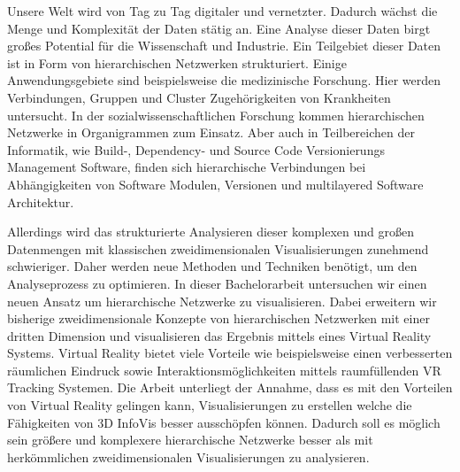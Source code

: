 Unsere Welt wird von Tag zu Tag digitaler und vernetzter. Dadurch wächst die Menge und Komplexität der Daten stätig an.
Eine Analyse dieser Daten birgt großes Potential für die Wissenschaft und Industrie.
Ein Teilgebiet dieser Daten ist in Form von hierarchischen Netzwerken strukturiert. Einige Anwendungsgebiete sind beispielsweise die medizinische Forschung. Hier werden Verbindungen, Gruppen und Cluster Zugehörigkeiten von Krankheiten untersucht. In der sozialwissenschaftlichen Forschung kommen hierarchischen Netzwerke in Organigrammen zum Einsatz. Aber auch in Teilbereichen der Informatik, wie Build-, Dependency- und Source Code Versionierungs Management Software, finden sich hierarchische Verbindungen bei Abhängigkeiten von Software Modulen, Versionen und multilayered Software Architektur. 

Allerdings wird das strukturierte Analysieren dieser komplexen und großen Datenmengen mit klassischen zweidimensionalen Visualisierungen zunehmend schwieriger.
Daher werden neue Methoden und Techniken benötigt, um den Analyseprozess zu optimieren. In dieser Bachelorarbeit untersuchen wir einen neuen Ansatz um hierarchische Netzwerke zu visualisieren. Dabei erweitern wir bisherige zweidimensionale Konzepte von hierarchischen Netzwerken mit einer dritten Dimension und visualisieren das Ergebnis mittels eines Virtual Reality Systems. Virtual Reality bietet viele Vorteile wie beispielsweise einen verbesserten räumlichen Eindruck sowie Interaktionsmöglichkeiten mittels raumfüllenden VR Tracking Systemen. 
Die Arbeit unterliegt der Annahme, dass es mit den Vorteilen von Virtual Reality gelingen kann, Visualisierungen zu erstellen welche die Fähigkeiten von 3D InfoVis besser ausschöpfen können. Dadurch soll es möglich sein größere und komplexere hierarchische Netzwerke besser als mit herkömmlichen zweidimensionalen Visualisierungen zu analysieren.